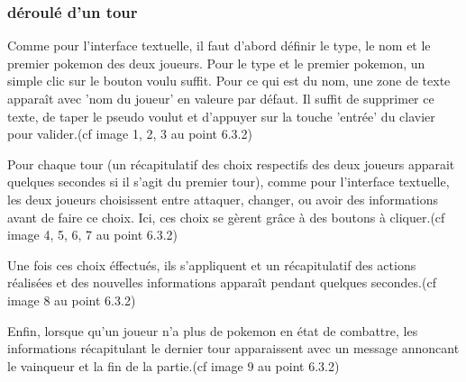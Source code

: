         
        
        \subsubsection{déroulé d'un tour}
            Comme pour l'interface textuelle, il faut d'abord définir le type, le nom et le premier pokemon des deux joueurs. Pour le type et le premier pokemon, un simple clic sur le bouton voulu suffit. Pour ce qui est du nom, une zone de texte apparaît avec 'nom du joueur' en valeure par défaut. Il suffit de supprimer ce texte, de taper le pseudo voulut et d'appuyer sur la touche 'entrée' du clavier pour valider.(cf image 1, 2, 3 au point 6.3.2)

            \bigskip

            Pour chaque tour (un récapitulatif des choix respectifs des deux joueurs apparait quelques secondes si il s'agit du premier tour), comme pour l'interface textuelle, les deux joueurs choisissent entre attaquer, changer, ou avoir des informations avant de faire ce choix. Ici, ces choix se gèrent grâce à des boutons à cliquer.(cf image 4, 5, 6, 7 au point 6.3.2)

            \bigskip

             Une fois ces choix éffectués, ils s'appliquent et un récapitulatif des actions réalisées et des nouvelles informations apparaît pendant quelques secondes.(cf image 8 au point 6.3.2)

             \bigskip

             Enfin, lorsque qu'un joueur n'a plus de pokemon en état de combattre, les informations récapitulant le dernier tour apparaissent avec un message annoncant le vainqueur et la fin de la partie.(cf image 9 au point 6.3.2)

             \bigskip
            
